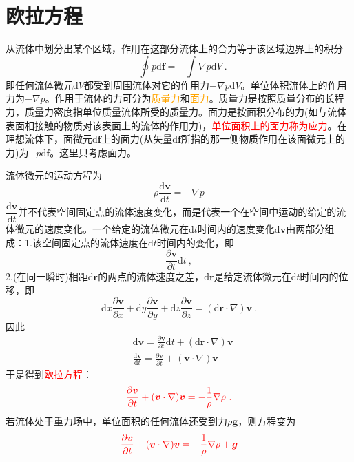 \documentclass[12pt,a4paper]{article}
\renewcommand{\vec}[1]{\boldsymbol{#1}}
\newcommand{\dif}{\mathrm{d}}
\begin{document}
\section{欧拉方程}
从流体中划分出某个区域，作用在这部分流体上的合力等于该区域边界上的积分
\begin{equation}
-\oint p \dif \vec{f} = -\int \nabla p \dif V ~.
\end{equation}
即任何流体微元$\dif V$都受到周围流体对它的作用力$-\nabla p \dif V$。单位体积流体上的作用力为$-\nabla p$。作用于流体的力可分为\textcolor{orange}{质量力}和\textcolor{orange}{面力}。质量力是按照质量分布的长程力，质量力密度指单位质量流体所受的质量力。面力是按面积分布的力(如与流体表面相接触的物质对该表面上的流体的作用力)，\textcolor{red}{单位面积上的面力称为应力}。在理想流体下，面微元$\dif \vec{f}$上的面力(从矢量$\dif \vec{f}$所指的那一侧物质作用在该面微元上的力)为$-p \dif \vec{f}$。这里只考虑面力。

流体微元的运动方程为
\begin{equation*}
\rho \frac{\dif \vec{v}}{\dif t} = -\nabla p
\end{equation*}
$\dfrac{\dif \vec{v}}{\dif t}$并不代表空间固定点的流体速度变化，而是代表一个在空间中运动的给定的流体微元的速度变化。一个给定的流体微元在$\dif t$时间内的速度变化$\dif \vec{v}$由两部分组成：1.该空间固定点的流体速度在$\dif t$时间内的变化，即
\begin{equation*}
 \frac{\partial \vec{v}}{\partial t} \dif t ~,
\end{equation*}
2.(在同一瞬时)相距$\dif \vec{r}$的两点的流体速度之差，$\dif \vec{r}$是给定流体微元在$\dif t$时间内的位移，即
\begin{equation*}
\dif x \frac{\partial \vec{v}}{\partial x} +\dif y \frac{\partial \vec{v}}{\partial y} +\dif z \frac{\partial \vec{v}}{\partial z} = (\dif \vec{r} \cdot \nabla) \vec{v} ~.
\end{equation*}
因此
\begin{align*}
& \dif \vec{v} =  \frac{\partial \vec{v}}{\partial t} \dif t +(\dif \vec{r} \cdot \nabla) \vec{v} \\
& \frac{\dif \vec{v}}{\dif t} = \frac{\partial \vec{v}}{\partial t} +(\vec{v} \cdot \nabla) \vec{v}
\end{align*}
于是得到\textcolor{red}{欧拉方程}：
\begin{equation}
\color{red} \frac{\partial \vec{v}}{\partial t} +(\vec{v} \cdot \nabla) \vec{v} = -\frac{1}{\rho} \nabla \rho ~.
\end{equation}
若流体处于重力场中，单位面积的任何流体还受到力$\rho \vec{g}$，则方程变为
\begin{equation}
\color{red} \frac{\partial \vec{v}}{\partial t} +(\vec{v} \cdot \nabla) \vec{v} = -\frac{1}{\rho} \nabla \rho + \vec{g}
\end{equation}
\end{document}
